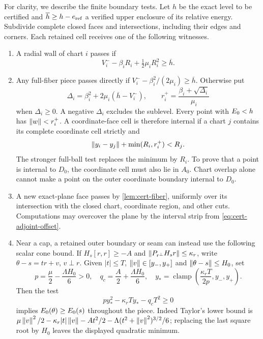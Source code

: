 For clarity, we describe the finite boundary tests. Let $h$ be the exact
level to be certified and $\overline h\ge h-e_{\rm ref}$ a verified
upper enclosure of its relative energy. Subdivide complete closed faces and intersections, including
their edges and corners. Each retained cell receives one of the
following witnesses.
\begin{enumerate}
\item A radial wall of chart $i$ passes if
\begin{equation}\label{eq:cert-radial-test}
 V_i^- -\beta_iR_i+\tfrac12\mu_iR_i^2\ge \overline h.
\end{equation}
\item Any full-fiber piece passes directly if
$V_i^--\beta_i^2/(2\mu_i)\ge \overline h$.
Otherwise put
\[
 \Delta_i=\beta_i^2+2\mu_i(\overline h-V_i^-),\qquad
 r_i^+=\frac{\beta_i+\sqrt{\Delta_i}}{\mu_i}
\]
when $\Delta_i\ge0$. A negative $\Delta_i$ excludes the sublevel.
Every point with $E_0<h$ has $\left\lVert w\right\rVert<r_i^+$. A coordinate-face cell
is therefore internal if a chart $j$ contains its complete coordinate
cell strictly and
\begin{equation}\label{eq:cert-overlap-test}
 \left\lVert y_i-y_j\right\rVert+\min(R_i,r_i^+)<R_j.
\end{equation}
The stronger full-ball test replaces the minimum by $R_i$.
To prove that a point is internal to $D_0$, the coordinate cell must also
lie in $A_0$. Chart overlap alone cannot make a point on the outer
coordinate boundary internal to $D_0$.
\item A new exact-plane face passes by
\cref{lem:cert-fiber}, uniformly over its intersection with the closed
chart, coordinate region, and other cuts. Computations may overcover
the plane by the interval strip from \eqref{eq:cert-adjoint-offset}.
\item Near a cap, a retained outer boundary or seam can instead use
the following scalar cone bound. If
$H_s[r,r]\ge-A$ and
$\left\lVert P_{r^\perp}H_sr\right\rVert\le\kappa_r$, write
$\theta-s=tr+v$, $v\perp r$. Given
$|t|\le T$, $\left\lVert v\right\rVert\in[y_-,y_+]$ and
$\left\lVert\theta-s\right\rVert\le H_0$, set
\[
 p=\frac\mu2-\frac{\Lambda H_0}{6}>0,\quad
 q_c=\frac A2+\frac{\Lambda H_0}{6},\quad
 y_* =\operatorname{clamp}\left(\frac{\kappa_rT}{2p},y_-,y_+\right).
\]
Then the test
\begin{equation}\label{eq:cert-cone-test}
 p y_*^2-\kappa_rT y_*-q_cT^2\ge0
\end{equation}
implies $E_0(\theta)\ge E_0(s)$ throughout the piece. Indeed Taylor's
lower bound is
$\mu\left\lVert v\right\rVert^2/2-\kappa_r|t|\left\lVert v\right\rVert-At^2/2
-\Lambda(t^2+\left\lVert v\right\rVert^2)^{3/2}/6$; replacing the last square root by
$H_0$ leaves the displayed quadratic minimum.
\end{enumerate}


